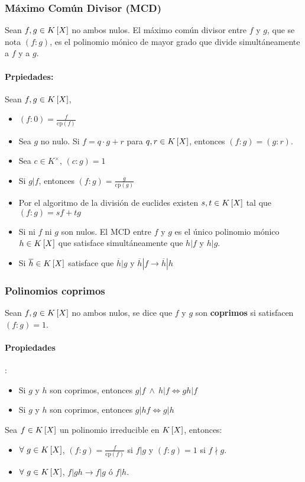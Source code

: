 \subsubsection{Máximo Común Divisor (MCD)}
Sean $f,g\in K\left[X\right]$ no ambos nulos. El máximo común divisor entre $f$ y $g$, que se nota $(f:g)$, es el polinomio mónico de mayor grado que divide simultáneamente a $f$ y a $g$.

\paragraph{Prpiedades:} Sean $f,g\in K\left[X\right]$,
\begin{itemize}
    \item $(f:0) = \frac{f}{\text{cp}(f)}$
    \item Sea $g$ no nulo. Si $f = q\cdot g + r$ para $q, r\in K\left[X\right]$, entonces $(f:g)= (g:r)$.
    \item Sea $c\in K^\times$, $(c:g) = 1$\
    \item Si $g|f$, entonces $(f:g) = \frac{g}{\text{cp}(g)}$
    \item Por el algoritmo de la división de euclides existen $s,t\in K\left[X\right]$ tal que $(f:g) = sf + tg$
    \item Si ni $f$ ni $g$ son nulos. El MCD entre $f$ y $g$ es el único polinomio mónico $h\in K\left[X\right]$ que satisface simultáneamente que $h|f$ y $h|g$.
    \item Si $\overline{h}\in K\left[X\right]$ satisface que $\overline{h}|g$ y $\overline{h}|f \to \overline{h}|h$  
\end{itemize}
\subsubsection{Polinomios coprimos}
Sean $f,g\in K\left[X\right]$ no ambos nulos, se dice que $f$ y $g$ son \textbf{coprimos} si satisfacen $(f:g)=1$.
\paragraph{Propiedades}:
\begin{itemize}
    \item Si $g$ y $h$ son coprimos, entonces $g|f~\land~h|f\iff gh|f$
    \item Si $g$ y $h$ son coprimos, entonces $g|hf\iff g|h$
\end{itemize}

Sea $f\in K\left[X\right]$ un polinomio irreducible en $K\left[X\right]$, entonces:
\begin{itemize}
    \item $\forall~g\in K\left[X\right]$, $(f:g)=\frac{f}{\text{cp}(f)}$ si $f|g$ y $(f:g) = 1$ si $f\nmid g$.
    \item $\forall~g\in K\left[X\right]$, $f|gh\to f|g$ ó $f|h$.
\end{itemize}

